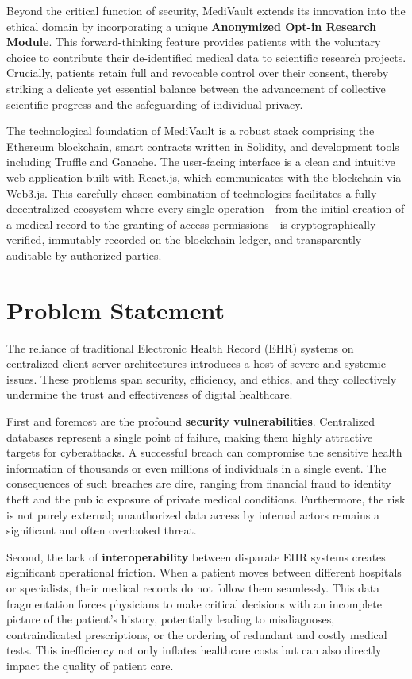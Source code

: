 Beyond the critical function of security, MediVault extends its innovation into the ethical domain by incorporating a unique \textbf{Anonymized Opt-in Research Module}. This forward-thinking feature provides patients with the voluntary choice to contribute their de-identified medical data to scientific research projects. Crucially, patients retain full and revocable control over their consent, thereby striking a delicate yet essential balance between the advancement of collective scientific progress and the safeguarding of individual privacy.

The technological foundation of MediVault is a robust stack comprising the Ethereum blockchain, smart contracts written in Solidity, and development tools including Truffle and Ganache. The user-facing interface is a clean and intuitive web application built with React.js, which communicates with the blockchain via Web3.js. This carefully chosen combination of technologies facilitates a fully decentralized ecosystem where every single operation—from the initial creation of a medical record to the granting of access permissions—is cryptographically verified, immutably recorded on the blockchain ledger, and transparently auditable by authorized parties.

\section{Problem Statement}
The reliance of traditional Electronic Health Record (EHR) systems on centralized client-server architectures introduces a host of severe and systemic issues. These problems span security, efficiency, and ethics, and they collectively undermine the trust and effectiveness of digital healthcare.

First and foremost are the profound \textbf{security vulnerabilities}. Centralized databases represent a single point of failure, making them highly attractive targets for cyberattacks. A successful breach can compromise the sensitive health information of thousands or even millions of individuals in a single event. The consequences of such breaches are dire, ranging from financial fraud to identity theft and the public exposure of private medical conditions. Furthermore, the risk is not purely external; unauthorized data access by internal actors remains a significant and often overlooked threat.

Second, the lack of \textbf{interoperability} between disparate EHR systems creates significant operational friction. When a patient moves between different hospitals or specialists, their medical records do not follow them seamlessly. This data fragmentation forces physicians to make critical decisions with an incomplete picture of the patient's history, potentially leading to misdiagnoses, contraindicated prescriptions, or the ordering of redundant and costly medical tests. This inefficiency not only inflates healthcare costs but can also directly impact the quality of patient care.

